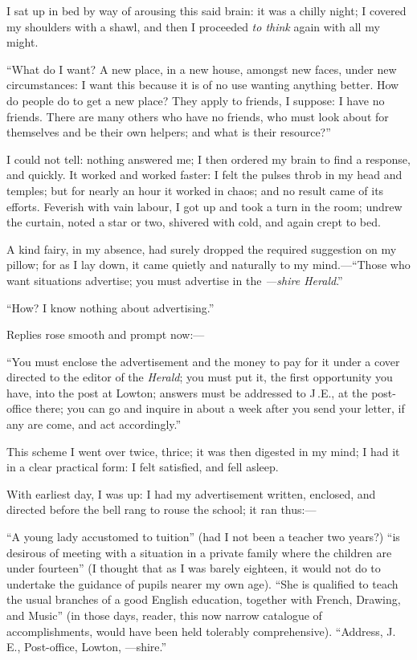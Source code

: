 I sat up in bed by way of arousing this said brain: it was a chilly
night; I covered my shoulders with a shawl, and then I proceeded
\emph{to think} again with all my might.

\enquote{What do I want? A new place, in a new house, amongst new
faces, under new circumstances: I want this because it is of no use
wanting anything better. How do people do to get a new place? They
apply to friends, I suppose: I have no friends. There are many others
who have no friends, who must look about for themselves and be their own
helpers; and what is their resource?}

I could not tell: nothing answered me; I then ordered my brain to find a
response, and quickly. It worked and worked faster: I felt the pulses
throb in my head and temples; but for nearly an hour it worked in chaos;
and no result came of its efforts. Feverish with vain labour, I got up
and took a turn in the room; undrew the curtain, noted a star or two,
shivered with cold, and again crept to bed.

A kind fairy, in my absence, had surely dropped the required suggestion
on my pillow; for as I lay down, it came quietly and naturally to my
mind.---\enquote{Those who want situations advertise; you must advertise in the
\emph{---shire Herald}.}

\enquote{How? I know nothing about advertising.}

Replies rose smooth and prompt now:---

\enquote{You must enclose the advertisement and the money to pay for it under a
cover directed to the editor of the \emph{Herald}; you must put it, the
first opportunity you have, into the post at Lowton; answers must be
addressed to J\,.E., at the post-office there; you can go and inquire in
about a week after you send your letter, if any are come, and act
accordingly.}

This scheme I went over twice, thrice; it was then digested in my mind;
I had it in a clear practical form: I felt satisfied, and fell asleep.

With earliest day, I was up: I had my advertisement written, enclosed,
and directed before the bell rang to rouse the school; it ran thus:---

\enquote{A young lady accustomed to tuition} (had I not been a teacher
two years?) \enquote{is desirous of meeting with a situation in a
private family where the children are under fourteen} (I thought that as
I was barely eighteen, it would not do to undertake the guidance of
pupils nearer my own age). \enquote{She is qualified to teach the usual
branches of a good English education, together with French, Drawing, and
Music} (in those days, reader, this now narrow catalogue of
accomplishments, would have been held tolerably comprehensive). 
\enquote{Address, J.\,E., Post-office, Lowton, ---shire.}

